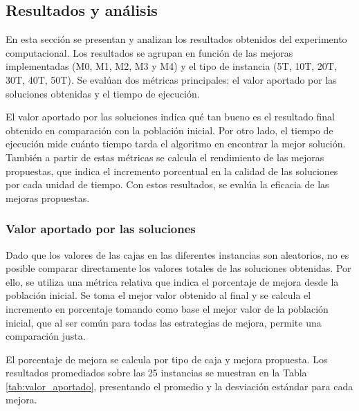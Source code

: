 \subsection{Resultados y análisis}

En esta sección se presentan y analizan los resultados obtenidos del experimento computacional. Los resultados se agrupan en función de las mejoras implementadas (M0, M1, M2, M3 y M4) y el tipo de instancia (5T, 10T, 20T, 30T, 40T, 50T). Se evalúan dos métricas principales: el valor aportado por las soluciones obtenidas y el tiempo de ejecución.

El valor aportado por las soluciones indica qué tan bueno es el resultado final obtenido en comparación con la población inicial. Por otro lado, el tiempo de ejecución mide cuánto tiempo tarda el algoritmo en encontrar la mejor solución. También a partir de estas métricas se calcula el rendimiento de las mejoras propuestas, que indica el incremento porcentual en la calidad de las soluciones por cada unidad de tiempo. Con estos resultados, se evalúa la eficacia de las mejoras propuestas.

\subsubsection{Valor aportado por las soluciones}

Dado que los valores de las cajas en las diferentes instancias son aleatorios, no es posible comparar directamente los valores totales de las soluciones obtenidas. Por ello, se utiliza una métrica relativa que indica el porcentaje de mejora desde la población inicial. Se toma el mejor valor obtenido al final y se calcula el incremento en porcentaje tomando como base el mejor valor de la población inicial, que al ser común para todas las estrategias de mejora, permite una comparación justa.

El porcentaje de mejora se calcula por tipo de caja y mejora propuesta. Los resultados promediados sobre las 25 instancias se muestran en la Tabla \ref{tab:valor_aportado}, presentando el promedio y la desviación estándar para cada mejora.

